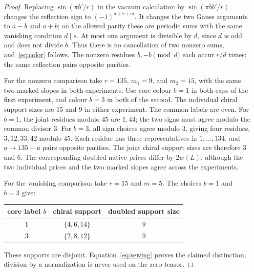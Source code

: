 \documentclass[11pt]{article}
\theoremstyle{remark}
\begin{document}
\begin{proof}
Replacing \(\sin(\pi b'/r)\) in the vacuum calculation by \(\sin(\pi b b'/r)\) changes the reflection sign to \((-1)^{a+b+m}\). It changes the two Gauss arguments to \(a-b\) and \(a+b\); on the allowed parity these are periodic sums with the same vanishing condition \(d\mid s\). At most one argument is divisible by \(d\), since \(d\) is odd and does not divide \(b\). Thus there is no cancellation of two nonzero sums, and~\eqref{eq:color} follows. The nonzero residues \(b,-b\pmod d\) each occur \(r/d\) times; the same reflection pairs opposite parities.

For the nonzero comparison take \(r=135\), \(m_1=9\), and \(m_2=15\), with the same two marked slopes in both experiments. Use core colour \(b=1\) in both caps of the first experiment, and colour \(b=3\) in both of the second. The individual chiral support sizes are \(15\) and \(9\) in either experiment. The common labels are even. For \(b=1\), the joint residues modulo \(45\) are \(1,44\); the two signs must agree modulo the common divisor \(3\). For \(b=3\), all sign choices agree modulo \(3\), giving four residues, \(3,12,33,42\) modulo \(45\). Each residue has three representatives in \(1,\dots,134\), and \(a\mapsto135-a\) pairs opposite parities. The joint chiral support sizes are therefore \(3\) and \(6\). The corresponding doubled native prices differ by \(2w(L)\), although the two individual prices and the two marked slopes agree across the experiments.

For the vanishing comparison take \(r=15\) and \(m=5\). The choices \(b=1\) and \(b=3\) give:
\begin{center}
\begin{tabular}{@{}ccc@{}}
\toprule
core label \(b\) & chiral support & doubled support size\\
\midrule
\(1\) & \(\{4,6,14\}\) & \(9\)\\
\(3\) & \(\{2,8,12\}\) & \(9\)\\
\bottomrule
\end{tabular}
\end{center}
These supports are disjoint. Equation~\eqref{eq:sewing} proves the claimed distinction; division by a normalization is never used on the zero tensor.
\end{proof}
\end{document}
